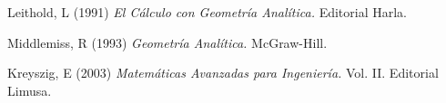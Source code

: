 \begin{titlepage}
\begin{thebibliography}{99}
 {\sc Leithold, L} (1991) {\it El C\'{a}lculo con Geometr\'{i}a Anal\'{i}tica.} Editorial Harla.

 {\sc Middlemiss, R} (1993) {\it Geometr\'{i}a Anal\'{i}tica.} McGraw-Hill.

 {\sc Kreyszig, E} (2003) {\it Matem\'{a}ticas Avanzadas para Ingenier\'{i}a.} Vol. II. Editorial Limusa.
\end{thebibliography}
\end{titlepage}


\begin{titlepage}
\author{%
\\
    Jos\'{e} Sanabria\\
    Departamento de Matem\'{a}ticas, N\'{u}cleo de Sucre\\
    Universidad de Oriente, Venezuela\\
    \texttt{\footnotesize jesanabri@gmail.com}\vspace{20pt} \\
         }
 \newcommand{\RE}{\mathrm{Re}}
 \newcommand{\IM}{\mathrm{Im}}
 \newcommand{\eps}{\varepsilon}
 \newcommand{\To}{\longrightarrow}
 \newcommand{\h}{\mathfrak{H}}
\newcommand{\Ho}{\mathcal{H}}
 \newcommand{\s}{\mathcal{S}}
 \newcommand{\A}{\mathrm{A}}
 \newcommand{\conv}{\xymatrix {*+<0.025cm>^[o][F-]{\star}}}
 \newcommand{\K}{\mathcal{K}}
 \newcommand{\J}{\mathcal{J}}
 \newcommand{\V}{\mathcal{V}}
  \newcommand{\B}{\mathcal{B}}
 \newcommand{\M}{\mathcal{M}}
 \newcommand{\E}{\mathbf{E}}
 \newcommand{\W}{\mathcal{W}}
 \newcommand{\I}{\mathcal{I}}
 \newcommand{\N}{\mathbb{N}}
\newcommand{\arctanh}{\textrm{arctanh}}
\newcommand{\arcsinh}{\textrm{arcsinh}}
\newcommand{\arccosh}{\textrm{arccosh}}
\newcommand{\sech}{\textrm{sech}}
 \newcommand{\je}{J_{\ell_{2}}}
 \newcommand{\WIA} {\widetilde{a}}
 \newcommand{\X}{\mathcal{X}}
  \newcommand{\Disk}{\mathbb{D}}
 \newcommand{\BOP}{\mathbf{B}}

\end{titlepage}
